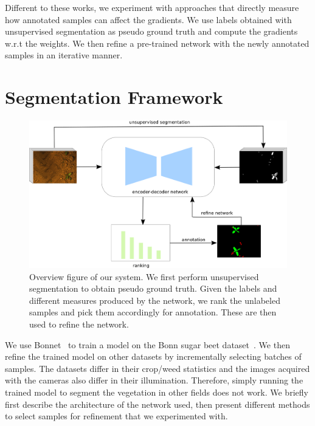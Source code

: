 \documentclass[letterpaper, 10 pt, conference]{ieeeconf}  %
\begin{document}
Different to these works, we experiment with approaches that directly measure how annotated samples can affect the gradients. We use labels obtained with unsupervised segmentation as pseudo ground truth and compute the gradients w.r.t the weights. We then refine a pre-trained network with the newly annotated samples in an iterative manner. 




\section{Segmentation Framework} \label{sec:approach}


    \begin{figure}
	\vspace{1em} 
    \centering
    \includegraphics[scale=0.9]{pics/output_system_overview.pdf}
   		\caption{Overview figure of our system. We first perform unsupervised segmentation to obtain pseudo ground truth. Given the labels and different measures produced by the network, we rank the unlabeled samples and pick them accordingly for annotation. These are then used to refine the network.}
		\label{fig:overview}    		
   \end{figure}


We use Bonnet~\cite{milioto2018bonnet} to train a model on the Bonn sugar beet dataset~\cite{chebrolu2017agricultural}. We then refine the trained model on other datasets by incrementally selecting batches of samples. The datasets differ in their crop/weed statistics and the images acquired with the cameras also differ in their illumination. Therefore, simply running the trained model to segment the vegetation in other fields does not work. We briefly first describe the architecture of the network used, then present different methods to select samples for refinement that we experimented with.
\end{document}
